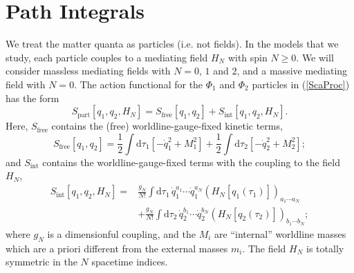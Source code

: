 \section{Path Integrals\label{sec3}}
We treat the matter quanta as particles (i.e. not fields). In the models that we study, each particle couples to a mediating field $H_{N}$ with spin $N \geq 0$. We will consider massless mediating fields with $N = 0$, $1$ and $2$, and a massive mediating field with $N = 0$. The action functional for the $\Phi_{1}$ and $\Phi_{2}$ particles in (\ref{ScaProc}) has the form
\begin{equation}
	S_{\text{part}}[ q_{1}, q_{2}, H_{N} ] = S_{\text{free}}[ q_{1}, q_{2} ] + S_{\text{int}}[ q_{1}, q_{2}, H_{N} ].
	\label{SP}
\end{equation}
Here, $S_{\text{free}}$ contains the (free) worldline-gauge-fixed kinetic terms,
\begin{equation}
	S_{\text{free}}[ q_{1}, q_{2} ] = \frac{1}{2}\int \mathrm{d}\tau_{1} \left[-\dot{q}_{1}^{2} + M_{1}^{2} \right] + \frac{1}{2} \int \mathrm{d}\tau_{2} \left[- \dot{q}_{2}^{2} + M_{2}^{2} \right];
\end{equation}
and $S_{\text{int}}$ contains the worldline-gauge-fixed terms with the coupling to the field $H_{N}$,
\begin{equation}
\begin{split}
	S_{\text{int}}[ q_{1}, q_{2}, H_{N} ] = {}& \frac{g_{N}}{N!} \int \mathrm{d} \tau_{1} \, \dot{q}_{1}^{a_{1}} \cdots \dot{q}_{1}^{a_{N}} (H_{N}[q_{1}(\tau_{1})])_{a_{1} \cdots a_{N}} \\
	&+ \frac{g_{N}}{N!} \int \mathrm{d} \tau_{2} \, \dot{q}_{2}^{b_{1}} \cdots \dot{q}_{2}^{b_{N}} (H_{N}[q_{2}(\tau_{2})])_{b_{1} \cdots b_{N}};
\end{split}
\label{Sint}
\end{equation}
where $g_{N}$ is a dimensionful coupling, and the $M_{i}$ are ``internal'' worldline masses which are a priori different from the external masses $m_{i}$. The field $H_{N}$ is totally symmetric in the $N$ spacetime indices.

